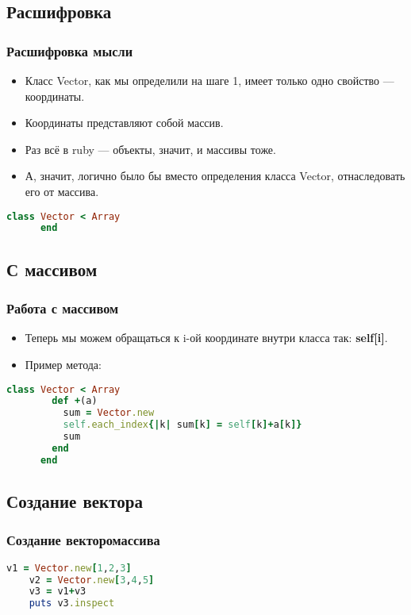 \documentclass[compress,red]{beamer}
\begin{document}
\subsection{Расшифровка}
\begin{frame}[fragile]
  \frametitle{Расшифровка мысли}
  \begin{itemize}
    \item Класс Vector, как мы определили на шаге 1, имеет только одно свойство --- координаты.
    \item Координаты представляют собой массив.
    \item Раз всё в ruby --- объекты, значит, и массивы тоже.
    \item А, значит, логично было бы вместо определения класса Vector, отнаследовать его от массива.
  \end{itemize}
    \scriptsize{
    \begin{lstlisting}[language=ruby,basicstyle=\footnotesize,label=ruby19,caption=Вектор vs Массив]
      class Vector < Array
      end
    \end{lstlisting}
    }
\end{frame}

\subsection{С массивом}
\begin{frame}[fragile]
  \frametitle{Работа с массивом}
  \begin{itemize}
    \item Теперь мы можем обращаться к i-ой координате внутри класса так: \textbf{self[i]}.
    \item Пример метода:
  \end{itemize}
    \scriptsize{
    \begin{lstlisting}[language=ruby,basicstyle=\footnotesize,label=ruby20, caption=Вектор как массив]
      class Vector < Array
        def +(a)
          sum = Vector.new
          self.each_index{|k| sum[k] = self[k]+a[k]}
          sum
        end      
      end
    \end{lstlisting}
    }
\end{frame}

\subsection{Создание вектора}
\begin{frame}[fragile]
  \frametitle{Создание векторомассива}
  \scriptsize{
  \begin{lstlisting}[language=ruby,basicstyle=\footnotesize,label=ruby21,caption=Создание]
    v1 = Vector.new[1,2,3]
    v2 = Vector.new[3,4,5]
    v3 = v1+v3
    puts v3.inspect
  \end{lstlisting}
  }
  
\end{frame}
\end{document}
